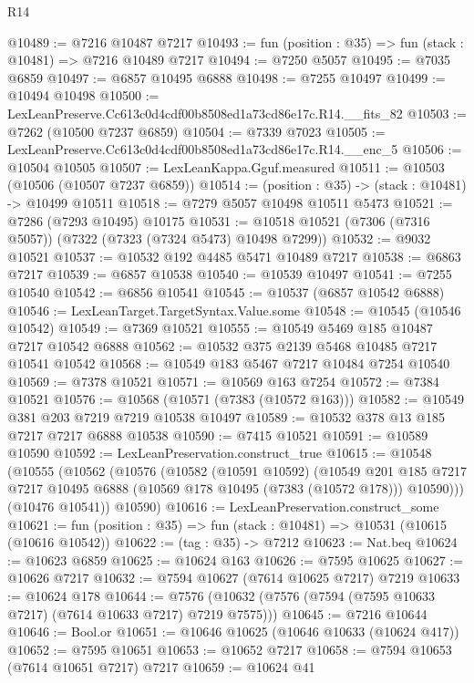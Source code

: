 \begin{lexlean}{R14}
\begin{coremodule}
@10489 := @7216 @10487 @7217
@10493 := fun (position : @35) => fun (stack : @10481) => @7216 @10489 @7217
@10494 := @7250 @5057
@10495 := @7035 @6859
@10497 := @6857 @10495 @6888
@10498 := @7255 @10497
@10499 := @10494 @10498
@10500 := LexLeanPreserve.Cc613c0d4cdf00b8508ed1a73cd86e17c.R14.__fits_82
@10503 := @7262 (@10500 @7237 @6859)
@10504 := @7339 @7023
@10505 := LexLeanPreserve.Cc613c0d4cdf00b8508ed1a73cd86e17c.R14.__enc_5
@10506 := @10504 @10505
@10507 := LexLeanKappa.Gguf.measured
@10511 := @10503 (@10506 (@10507 @7237 @6859))
@10514 := (position : @35) -> (stack : @10481) -> @10499 @10511
@10518 := @7279 @5057 @10498 @10511 @5473
@10521 := @7286 (@7293 @10495) @10175
@10531 := @10518 @10521 (@7306 (@7316 @5057)) (@7322 (@7323 (@7324 @5473) @10498 @7299))
@10532 := @9032 @10521
@10537 := @10532 @192 @4485 @5471 @10489 @7217
@10538 := @6863 @7217
@10539 := @6857 @10538
@10540 := @10539 @10497
@10541 := @7255 @10540
@10542 := @6856 @10541
@10545 := @10537 (@6857 @10542 @6888)
@10546 := LexLeanTarget.TargetSyntax.Value.some
@10548 := @10545 (@10546 @10542)
@10549 := @7369 @10521
@10555 := @10549 @5469 @185 @10487 @7217 @10542 @6888
@10562 := @10532 @375 @2139 @5468 @10485 @7217 @10541 @10542
@10568 := @10549 @183 @5467 @7217 @10484 @7254 @10540
@10569 := @7378 @10521
@10571 := @10569 @163 @7254
@10572 := @7384 @10521
@10576 := @10568 (@10571 (@7383 (@10572 @163)))
@10582 := @10549 @381 @203 @7219 @7219 @10538 @10497
@10589 := @10532 @378 @13 @185 @7217 @7217 @6888 @10538
@10590 := @7415 @10521
@10591 := @10589 @10590
@10592 := LexLeanPreservation.construct_true
@10615 := @10548
    (@10555
      (@10562
        (@10576
          (@10582
            (@10591 @10592)
            (@10549
              @201
              @185
              @7217
              @7217
              @10495
              @6888
              (@10569 @178 @10495 (@7383 (@10572 @178)))
              @10590)))
        (@10476 @10541))
      @10590)
@10616 := LexLeanPreservation.construct_some
@10621 := fun (position : @35) => fun (stack : @10481) => @10531 (@10615 (@10616 @10542))
@10622 := (tag : @35) -> @7212
@10623 := Nat.beq
@10624 := @10623 @6859
@10625 := @10624 @163
@10626 := @7595 @10625
@10627 := @10626 @7217
@10632 := @7594 @10627 (@7614 @10625 @7217) @7219
@10633 := @10624 @178
@10644 := @7576 (@10632 (@7576 (@7594 (@7595 @10633 @7217) (@7614 @10633 @7217) @7219 @7575)))
@10645 := @7216 @10644
@10646 := Bool.or
@10651 := @10646 @10625 (@10646 @10633 (@10624 @417))
@10652 := @7595 @10651
@10653 := @10652 @7217
@10658 := @7594 @10653 (@7614 @10651 @7217) @7217
@10659 := @10624 @41

\end{coremodule}
\end{lexlean}
